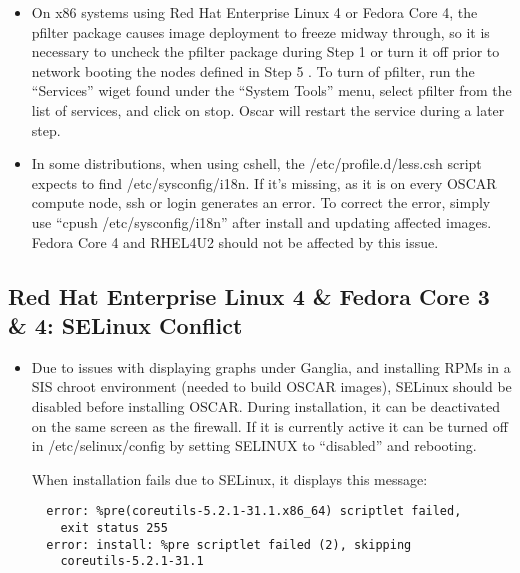\begin{itemize}
\item On x86 systems using Red Hat Enterprise Linux 4 or Fedora Core 4,
  the pfilter package causes image deployment to freeze midway through,
  so it is necessary to uncheck the pfilter package during Step 1 
   or turn it off prior to 
  network booting the nodes defined in Step 5 .
  To turn of pfilter, run the ``Services'' wiget found under the
  ``System Tools'' menu, select pfilter from the list of services, and
  click on stop.  Oscar will restart the service during a later step.

\item In some distributions, when using cshell, the 
  /etc/profile.d/less.csh script expects to find /etc/sysconfig/i18n. If 
  it's missing, as it is on every OSCAR compute node, ssh or login
  generates an error.  To correct the error, simply use 
  ``cpush /etc/sysconfig/i18n'' after install and updating affected images.
  Fedora Core 4 and RHEL4U2 should not be affected by this issue.

\end{itemize}


\subsection{Red Hat Enterprise Linux 4 \& Fedora Core 3 \& 4: SELinux Conflict }
\label{subsec:SELinuxnotes}

\begin{itemize}

\item Due to issues with displaying graphs under Ganglia, and installing
  RPMs in a SIS chroot environment (needed to build OSCAR images), SELinux 
  should be disabled before installing OSCAR.  During installation, it can be
  deactivated on the same screen as the firewall.  If it is currently
  active it can be turned off in /etc/selinux/config by setting SELINUX 
  to ``disabled'' and rebooting.

  When installation fails due to SELinux, it displays this message:
  \begin{verbatim}
  error: %pre(coreutils-5.2.1-31.1.x86_64) scriptlet failed, 
    exit status 255
  error: install: %pre scriptlet failed (2), skipping 
    coreutils-5.2.1-31.1
  \end{verbatim}
\end{itemize}


